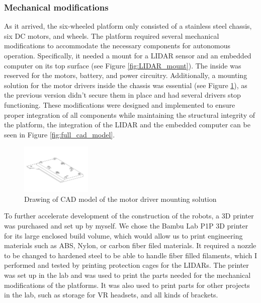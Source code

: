 \documentclass[12pt]{article}
\begin{document}
        \subsubsection{Mechanical modifications}
        As it arrived, the six-wheeled platform only consisted of a stainless steel chassis, six DC motors, and wheels. The platform required several mechanical modifications to accommodate the necessary components for autonomous operation. Specifically, it needed a mount for a LIDAR sensor and an embedded computer on its top surface (see Figure \ref{fig:LIDAR_mount}). The inside was reserved for the motors, battery, and power circuitry. Additionally, a mounting solution for the motor drivers inside the chassis was essential (see Figure \ref{fig:motor_driver_mount}), as the previous version didn't secure them in place and had several drivers stop functioning. These modifications were designed and implemented to ensure proper integration of all components while maintaining the structural integrity of the platform, the integration of the LIDAR and the embedded computer can be seen in Figure \ref{fig:full_cad_model}.
        
        \begin{figure}[H]
            \centering
            \includegraphics[width=0.3\textwidth]{Images/Motor_driver_holder.pdf}
            \caption{Drawing of CAD model of the motor driver mounting solution}
            \label{fig:motor_driver_mount}
        \end{figure}
        
        To further accelerate development of the construction of the robots, a 3D printer was purchased and set up by myself. We chose the Bambu Lab P1P 3D printer for its large enclosed build volume, which would allow us to print engineering materials such as ABS, Nylon, or carbon fiber filed materials. It required a nozzle to be changed to hardened steel to be able to handle fiber filled filaments, which I performed and tested by printing protection cages for the LIDARs. The printer was set up in the lab and was used to print the parts needed for the mechanical modifications of the platforms. It was also used to print parts for other projects in the lab, such as storage for VR headsets, and all kinds of brackets.
\end{document}
